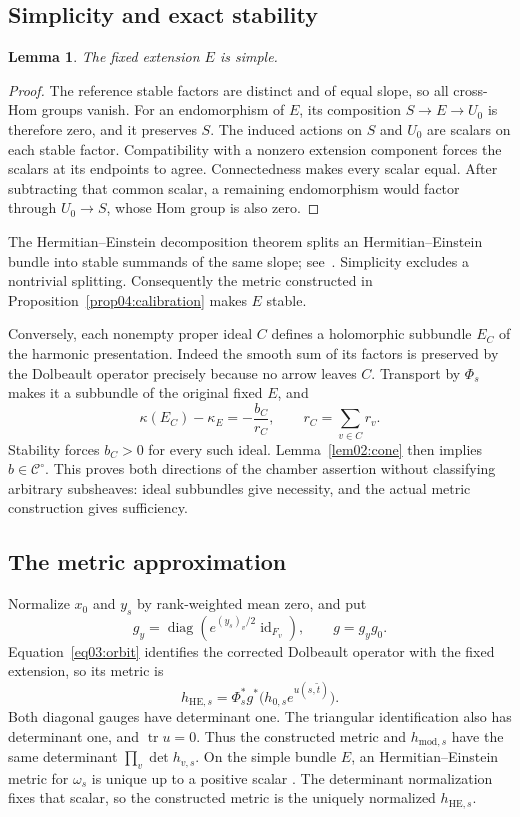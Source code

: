 \documentclass[11pt]{amsart}
\newtheorem{lemma}[theorem]{Lemma}
\theoremstyle{definition}
\theoremstyle{remark}
\newcommand{\tr}{\operatorname{tr}}
\newcommand{\diag}{\operatorname{diag}}
\newcommand{\id}{\operatorname{id}}
\newcommand{\cC}{\mathcal C}
\begin{document}
\subsection{Simplicity and exact stability}

\begin{lemma}\label{lem04:simple}
The fixed extension \(E\) is simple.
\end{lemma}

\begin{proof}
The reference stable factors are distinct and of equal slope, so
all cross-Hom groups vanish. For an endomorphism of \(E\), its
composition \(S\to E\to U_0\) is therefore zero, and it preserves
\(S\). The induced actions on \(S\) and \(U_0\) are scalars
on each stable factor. Compatibility with a nonzero extension
component forces the scalars at its endpoints to agree.
Connectedness makes every scalar equal. After subtracting that
common scalar, a remaining endomorphism would factor through
\(U_0\to S\), whose Hom group is also zero.
\end{proof}

The Hermitian--Einstein decomposition theorem splits an
Hermitian--Einstein bundle into stable summands of the same slope;
see~\cite[Theorem 5.8.3]{kobayashi1987}.
Simplicity excludes a nontrivial splitting. Consequently the metric
constructed in Proposition~\ref{prop04:calibration} makes \(E\)
stable.

Conversely, each nonempty proper ideal \(C\) defines a holomorphic
subbundle \(E_C\) of the harmonic presentation. Indeed the smooth
sum of its factors is preserved by the Dolbeault operator precisely
because no arrow leaves \(C\). Transport by \(\Phi_s\) makes it
a subbundle of the original fixed \(E\), and
\[
 \kappa(E_C)-\kappa_E
 =-\frac{b_C}{r_C},\qquad r_C=\sum_{v\in C}r_v.
\]
Stability forces \(b_C>0\) for every such ideal.
Lemma~\ref{lem02:cone} then implies \(b\in\cC^\circ\).
This proves both directions of the chamber assertion without
classifying arbitrary subsheaves: ideal subbundles give necessity,
and the actual metric construction gives sufficiency.

\subsection{The metric approximation}

Normalize \(x_0\) and \(y_s\) by rank-weighted mean zero, and put
\[
 g_y=\diag(e^{(y_s)_v/2}\id_{F_v}),\qquad g=g_yg_0.
\]
Equation~\eqref{eq03:orbit} identifies the corrected Dolbeault
operator with the fixed extension, so its metric is
\[
 h_{\mathrm{HE},s}
 =\Phi_s^*g^*\bigl(h_{0,s}e^{u(s,\widetilde t)}\bigr).
\]
Both diagonal gauges have determinant one. The triangular
identification also has determinant one, and \(\tr u=0\).
Thus the constructed metric and \(h_{\mathrm{mod},s}\) have
the same determinant \(\prod_v\det h_{v,s}\).
On the simple bundle \(E\), an Hermitian--Einstein metric for
\(\omega_s\) is unique up to a positive scalar
\cite[Proposition~6.3.37(a),(d)]{kobayashi1987}.
The determinant normalization fixes that scalar, so the constructed
metric is the uniquely normalized \(h_{\mathrm{HE},s}\).
\end{document}
